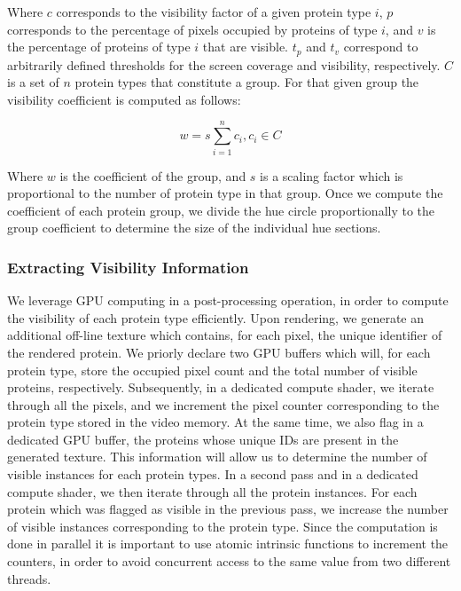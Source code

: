 \documentclass[review,journal]{vgtc}         %
\begin{document}
	Where $c$ corresponds to the visibility factor of a given protein type $i$, $p$ corresponds to the percentage of pixels occupied by proteins of type $i$, and $v$ is the percentage of proteins of type $i$ that are visible.
	$t_{p}$ and $t_{v}$ correspond to arbitrarily defined thresholds for the screen coverage and visibility, respectively. 
	$C$ is a set of $n$ protein types that constitute a group.
	For that given group the visibility coefficient is computed as follows:
	
	\begin{equation}
	w = s\sum_{i=1}^{n} c_{i}, c_{i} \in C
	\end{equation}
	
	Where $w$ is the coefficient of the group, and $s$ is a scaling factor which is proportional to the number of protein type in that group. 
	Once we compute the coefficient of each protein group, we divide the hue circle proportionally to the group coefficient to determine the size of the individual hue sections. \\
	
	\subsubsection{Extracting Visibility Information}
	\label{sssec:extracting}
	We leverage GPU computing in a post-processing operation, in order to compute the visibility of each protein type efficiently.
	Upon rendering, we generate an additional off-line texture which contains, for each pixel, the unique identifier of the rendered protein.
	We priorly declare two GPU buffers which will, for each protein type, store the occupied pixel count and the total number of visible proteins, respectively.
	Subsequently, in a dedicated compute shader, we iterate through all the pixels, and we increment the pixel counter corresponding to the protein type stored in the video memory.
	At the same time, we also flag in a dedicated GPU buffer, the proteins whose unique IDs are present in the generated texture.
	This information will allow us to determine the number of visible instances for each protein types.
	In a second pass and in a dedicated compute shader, we then iterate through all the protein instances.
	For each protein which was flagged as visible in the previous pass, we increase the number of visible instances corresponding to the protein type.
	Since the computation is done in parallel it is important to use atomic intrinsic functions to increment the counters, in order to avoid concurrent access to the same value from two different threads.
	
\end{document}
